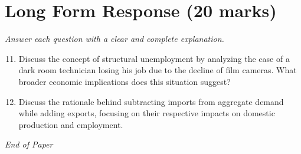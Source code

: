 \documentclass[12pt]{article}
\begin{document}
\section*{Long Form Response (20 marks)}
\textit{Answer each question with a clear and complete explanation.}
\begin{enumerate}[label=\arabic*.]
\setcounter{enumi}{10}
\item Discuss the concept of structural unemployment by analyzing the case of a dark room technician losing his job due to the decline of film cameras. What broader economic implications does this situation suggest?
\item Discuss the rationale behind subtracting imports from aggregate demand while adding exports, focusing on their respective impacts on domestic production and employment.
\end{enumerate}

\vfill
\noindent\textit{End of Paper}
\end{document}
